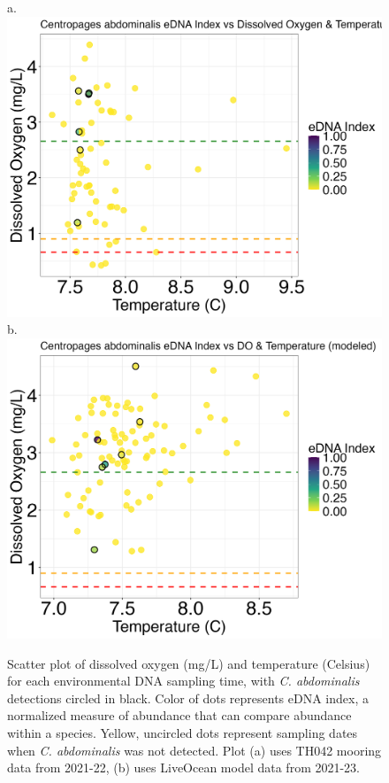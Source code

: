 \documentclass[12pt,twoside]{reedthesis}
\begin{document}
	\begin{figure}[!h]
		\begin{center}
			a. \includegraphics[scale=0.3]{Cabdominalis_Scatter_noOut}
			b. \includegraphics[scale=0.3]{Cabdominalis_Scatter_AllYr_mod_noOut}
			\caption[\textit{C. abdominalis} scatterplot]{\footnotesize{Scatter plot of dissolved oxygen (mg/L) and temperature (Celsius) for each environmental DNA sampling time, with \textit{C. abdominalis} detections circled in black. Color of dots represents eDNA index, a normalized measure of abundance that can compare abundance within a species. Yellow, uncircled dots represent sampling dates when \textit{C. abdominalis} was not detected. Plot (a) uses TH042 mooring data from 2021-22, (b) uses LiveOcean model data from 2021-23.}} %
		\end{center}
		\label{CabdominalisScatter}
	\end{figure} 
	
\end{document}
